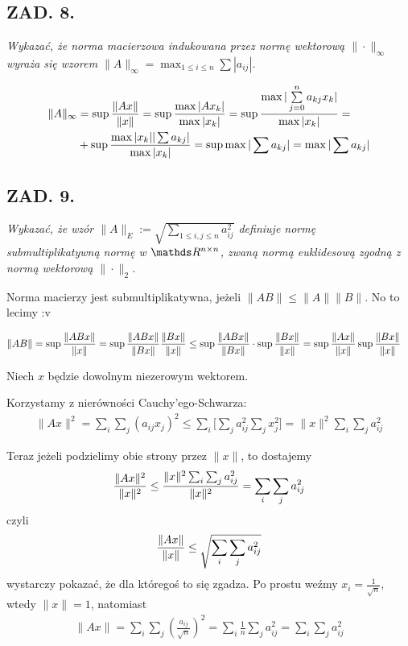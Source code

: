 \documentclass{article}[16pt]
\begin{document}
\subsection*{ZAD. 8.}
\emph{Wykazać, że norma macierzowa indukowana przez normę wektorową $\|\cdot\|_\infty$ wyraża się wzorem $\|A\|_\infty=\max_{1\leq i\leq n}\sum|a_{ij}|$.}
\medskip

\medskip

\begin{align*}
    \|A\|_\infty&=\sup{\|Ax\|\over \|x\|}=\sup{\max|Ax_k|\over\max|x_k|}=\sup{{\max|\sum\limits_{j=0}^na_{kj}x_k|}\over\max|x_k|}=\\
    &+\sup{\max|x_k||\sum a_{kj}|\over\max|x_k|}=\sup\max|\sum a_{kj}|=\max|\sum a_{kj}|
\end{align*}

\subsection*{ZAD. 9.}
\emph{Wykazać, że wzór $\|A\|_E:=\sqrt{\sum_{1\leq i,j\leq n} a_{ij}^2}$ definiuje normę submultiplikatywną normę w $\R^{n\times n}$, zwaną normą euklidesową zgodną z normą wektorową $\|\cdot\|_2$.}
\medskip

\medskip

Norma macierzy jest submultiplikatywna, jeżeli $\|AB\|\leq\|A\|\|B\|$. No to lecimy :v
\medskip

\begin{align*}
    \|AB\|&=\sup{\|ABx\|\over\|x\|}=\sup{\|ABx\|\over\|Bx\|}{\|Bx\|\over\|x\|}\leq\sup{\|ABx\|\over\|Bx\|}\cdot\sup{\|Bx\|\over\|x\|}=\sup{\|Ax\|\over\|x\|}\sup{\|Bx\|\over \|x\|}
\end{align*}

Niech $x$ będzie dowolnym niezerowym wektorem.

Korzystamy z nierówności Cauchy'ego-Schwarza:
\begin{align*}
    \|Ax\|^2=\sum_i\sum_j(a_{ij}x_j)^2\leq \sum_i\Big[\sum_ja_{ij}^2\sum_jx_j^2\Big]=\|x\|^2\sum_i\sum_ja_{ij}^2
\end{align*}

Teraz jeżeli podzielimy obie strony przez $\|x\|$, to dostajemy
\begin{align*}
    {\|Ax\|^2\over\|x\|^2}\leq{\|x\|^2\sum_i\sum_ja_{ij}^2\over\|x\|^2}=\sum_i\sum_ja_{ij}^2
\end{align*}
czyli
$${\|Ax\|\over\|x\|}\leq\sqrt{\sum_i\sum_ja_{ij}^2}$$
wystarczy pokazać, że dla któregoś to się zgadza. Po prostu weźmy $x_i=\frac1{\sqrt{n}}$, wtedy $\|x\|=1$, natomiast
\begin{align*}
    \|Ax\|=\sum_i\sum_j(\frac{a_{ij}}{\sqrt{n}})^2=\sum_i\frac1n\sum_ja_{ij}^2=\sum_i\sum_ja_{ij}^2
\end{align*}
\end{document}
